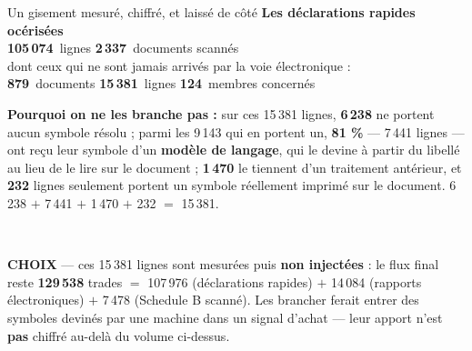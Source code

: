\documentclass[11pt,aspectratio=169]{beamer}
\newcommand{\kpi}[3]{{\large\textbf{\textcolor{#1}{#2}}}~{\footnotesize #3}}
\newcommand{\defl}[1]{{\scriptsize\color{black!55}#1}}
\newcommand{\choixbox}[1]{%
  \colorbox{alertred!8}{\parbox{\dimexpr\linewidth-8pt}{\scriptsize
    \textbf{\textcolor{alertred}{CHOIX}}\; --- #1}}}
\begin{document}
\begin{frame}{Un gisement mesuré, chiffré, et laissé de côté}
  \centering
  {\footnotesize\textbf{Les déclarations rapides océrisées}}\\[1.5mm]
  \kpi{dataC}{105\,074}{lignes}\quad
  \kpi{dataC}{2\,337}{documents scannés}\\[2mm]
  \defl{dont ceux qui ne sont jamais arrivés par la voie électronique :}\\[1.5mm]
  \kpi{alertred}{879}{documents}\quad
  \kpi{alertred}{15\,381}{lignes}\quad
  \kpi{alertred}{124}{membres concernés}\\[3mm]
  \begin{minipage}{0.92\textwidth}{\footnotesize
   \textbf{Pourquoi on ne les branche pas :} sur ces 15\,381 lignes, \textbf{6\,238} ne portent
   aucun symbole résolu ; parmi les 9\,143 qui en portent un, \textbf{81 \%} --- 7\,441 lignes ---
   ont reçu leur symbole d'un \textbf{modèle de langage}, qui le devine à partir du libellé
   au lieu de le lire sur le document ; \textbf{1\,470} le tiennent d'un traitement antérieur, et
   \textbf{232} lignes seulement portent un symbole réellement imprimé sur le document.
   \defl{6\,238 $+$ 7\,441 $+$ 1\,470 $+$ 232 $=$ 15\,381.}}\end{minipage}\\[3mm]
  \choixbox{ces 15\,381 lignes sont mesurées puis \textbf{non injectées} : le flux final reste
  \textbf{129\,538} trades $=$ 107\,976 (déclarations rapides) $+$ 14\,084 (rapports
  électroniques) $+$ 7\,478 (Schedule B scanné). Les brancher ferait entrer des symboles
  devinés par une machine dans un signal d'achat --- leur apport n'est \textbf{pas} chiffré
  au-delà du volume ci-dessus.}
\end{frame}
\end{document}
